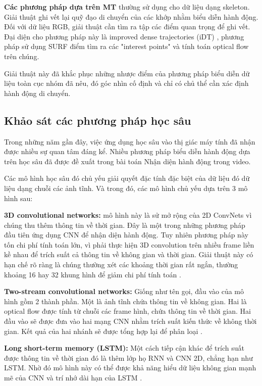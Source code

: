 \textbf{Các phương pháp dựa trên MT} thường sử dụng cho dữ liệu dạng skeleton. Giải thuật ghi vết lại quỹ đạo di chuyển của các khớp nhằm biểu diễn hành động. Đối với dữ liệu RGB, giải thuật cần tìm ra tập các điểm quan trọng để ghi vết. Đại diện cho phương pháp này là improved dense trajectories (iDT) \cite{wang2013action}, phương pháp sử dụng SURF điểm tìm ra các "interest points" và tính toán optical flow trên chúng.

Giải thuật này đã khắc phục những nhược điểm của phương pháp biểu diễn dữ liệu toàn cục nhóm đã nêu, đó góc nhìn cố định và chỉ có chủ thể  cần xác định hành động di chuyển.

\subsection{Khảo sát các phương pháp học sâu}
\label{survey:method-deep-learning}

Trong những năm gần đây, việc ứng dụng học sâu vào thị giác máy tính đã nhận được nhiều sự quan tâm đáng kể. Nhiều phương pháp biểu diễn hành động dựa trên học sâu đã được đề xuất trong bài toán Nhận diện hành động trong video.

Các mô hình học sâu đó chủ yếu giải quyết đặc tính đặc biệt của dữ liệu đó dữ liệu dạng chuỗi các ảnh tĩnh. Và trong đó, các mô hình chủ yếu dựa trên 3 mô hình sau:


\textbf{3D convolutional networks:} mô hình này là sử mở rộng của 2D ConvNets vì chúng thu thêm thông tin về thời gian. Đây là một trong những phương pháp đầu tiên ứng dụng CNN để nhận diện hành động. Tuy nhiên phương pháp này tốn chi phí tính toán lớn, vì phải thực hiện 3D convolution trên nhiều frame liền kề nhau để trích suất cả thông tin về không gian và thời gian. Giải thuật này có hạn chế  rõ ràng là chúng thường xét các khoảng thời gian rất ngắn, thường khoảng 16 hay 32 khung hình để giảm chi phí tính toán \cite{ji20123d}.

\textbf{Two-stream convolutional networks:} Giống như tên gọi, đầu vào của mô hình gồm 2 thành phần. Một là ảnh tĩnh chứa thông tin về không gian. Hai là optical flow được tính từ chuỗi các frame hình, chứa thông tin về thời gian. Hai đầu vào sẽ được đưa vào hai mạng CNN nhằm trích suất kiến thức về không thời gian. Kết quả của hai nhánh sẽ được tổng hợp lại để phân loại \cite{simonyan2014two}.

\textbf{Long short-term memory (LSTM):} Một cách tiếp cận khác để trích suất được thông tin về thời gian đó là thêm lớp họ RNN và CNN 2D, chẳng hạn như LSTM. Nhờ đó mô hình này có thể được khả năng hiểu dữ liệu không gian mạnh mẽ của CNN và trí nhớ dài hạn của LSTM \cite{liu2016spatio}.

